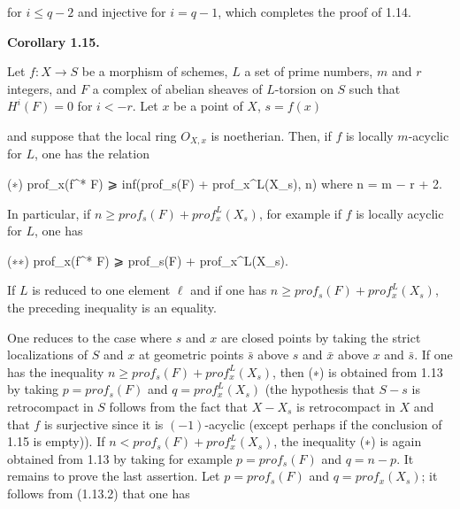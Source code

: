\documentclass[
  11pt,
  a4paper,
]{book}
\newenvironment{Shaded}{}{}
\newcommand{\NormalTok}[1]{#1}
\begin{document}
for \(i \leqslant q - 2\) and injective for \(i = q - 1\), which
completes the proof of 1.14.

\textbf{Corollary 1.15.}

Let \(f : X \to S\) be a morphism of schemes, \(L\) a set of prime
numbers, \(m\) and \(r\) integers, and \(F\) a complex of abelian
sheaves of \(L\)-torsion on \(S\) such that \(H^{i}(F) = 0\) for
\(i < -r\). Let \(x\) be a point of \(X\), \(s = f(x)\)

and suppose that the local ring \(O_{X,x}\) is noetherian. Then, if
\(f\) is locally \(m\)-acyclic for \(L\), one has the relation

\begin{Shaded}
\begin{Highlighting}[]
\NormalTok{(∗)    prof\_x(f\^{}* F) ⩾ inf(prof\_s(F) + prof\_x\^{}L(X\_s), n)   where n = m − r + 2.}
\end{Highlighting}
\end{Shaded}

In particular, if \(n \geqslant prof_{s}(F) + prof^{L}_{x}(X_{s})\), for
example if \(f\) is locally acyclic for \(L\), one has

\begin{Shaded}
\begin{Highlighting}[]
\NormalTok{(∗∗)   prof\_x(f\^{}* F) ⩾ prof\_s(F) + prof\_x\^{}L(X\_s).}
\end{Highlighting}
\end{Shaded}

If \(L\) is reduced to one element \(\ell\) and if one has
\(n \geqslant prof_{s}(F) + prof^{L}_{x}(X_{s})\), the preceding
inequality is an equality.

One reduces to the case where \(s\) and \(x\) are closed points by
taking the strict localizations of \(S\) and \(x\) at geometric points
\(\bar{s}\) above \(s\) and \(\bar{x}\) above \(x\) and \(\bar{s}\). If
one has the inequality \(n \geqslant
prof_{s}(F) + prof^{L}_{x}(X_{s})\), then (∗) is obtained from 1.13 by
taking \(p = prof_{s}(F)\) and \(q =
prof^{L}_{x}(X_{s})\) (the hypothesis that \(S - {s}\) is retrocompact
in \(S\) follows from the fact that \(X - X_{s}\) is retrocompact in
\(X\) and that \(f\) is surjective since it is \((-1)\)-acyclic (except
perhaps if the conclusion of 1.15 is empty)). If
\(n < prof_{s}(F) + prof^{L}_{x}(X_{s})\), the inequality (∗) is again
obtained from 1.13 by taking for example \(p = prof_{s}(F)\) and
\(q = n - p\). It remains to prove the last assertion. Let
\(p = prof_{s}(F)\) and \(q =
prof_{x}(X_{s})\); it follows from (1.13.2) that one has
\end{document}
